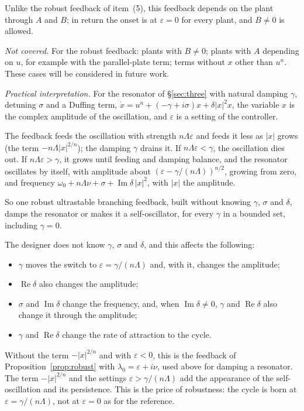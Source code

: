\documentclass[11pt,reqno]{amsart}
\theoremstyle{plain}
\theoremstyle{definition}
\theoremstyle{remark}
\begin{document}
\begin{enumerate}
Unlike the robust feedback of item~(5), this feedback depends on the plant through $A$ and $B$; in return the onset is at $\varepsilon=0$ for every plant, and $B\ne0$ is allowed.

\emph{Not covered.} For the robust feedback: plants with $B\ne0$; plants with $A$ depending on $u$, for example with the parallel-plate term; terms without $x$ other than $u^{n}$. These cases will be considered in future work.

\emph{Practical interpretation.} For the resonator of \S\ref{sec:three} with natural damping $\gamma$, detuning $\sigma$ and a Duffing term, $\dot x=u^{n}+(-\gamma+i\sigma)x+\delta|x|^{2}x$, the variable $x$ is the complex amplitude of the oscillation, and $\varepsilon$ is a setting of the controller.

The feedback feeds the oscillation with strength $n\Lambda\varepsilon$ and feeds it less as $|x|$ grows (the term $-n\Lambda|x|^{2/n}$); the damping $\gamma$ drains it. If $n\Lambda\varepsilon<\gamma$, the oscillation dies out. If $n\Lambda\varepsilon>\gamma$, it grows until feeding and damping balance, and the resonator oscillates by itself, with amplitude about $(\varepsilon-\gamma/(n\Lambda))^{n/2}$, growing from zero, and frequency $\omega_0+n\Lambda\nu+\sigma+\operatorname{Im}\delta\,|x|^{2}$, with $|x|$ the amplitude.

So one robust ultrastable branching feedback, built without knowing $\gamma$, $\sigma$ and $\delta$, damps the resonator or makes it a self-oscillator, for every $\gamma$ in a bounded set, including $\gamma=0$.

The designer does not know $\gamma$, $\sigma$ and $\delta$, and this affects the following:
\begin{itemize}
\item $\gamma$ moves the switch to $\varepsilon=\gamma/(n\Lambda)$ and, with it, changes the amplitude;
\item $\operatorname{Re}\delta$ also changes the amplitude;
\item $\sigma$ and $\operatorname{Im}\delta$ change the frequency, and, when $\operatorname{Im}\delta\ne0$, $\gamma$ and $\operatorname{Re}\delta$ also change it through the amplitude;
\item $\gamma$ and $\operatorname{Re}\delta$ change the rate of attraction to the cycle.
\end{itemize}
Without the term $-|x|^{2/n}$ and with $\varepsilon<0$, this is the feedback of Proposition~\ref{prop:robust} with $\lambda_0=\varepsilon+i\nu$, used above for damping a resonator. The term $-|x|^{2/n}$ and the settings $\varepsilon>\gamma/(n\Lambda)$ add the appearance of the self-oscillation and its persistence. This is the price of robustness: the cycle is born at $\varepsilon=\gamma/(n\Lambda)$, not at $\varepsilon=0$ as for the reference.
\end{enumerate}
\end{document}
